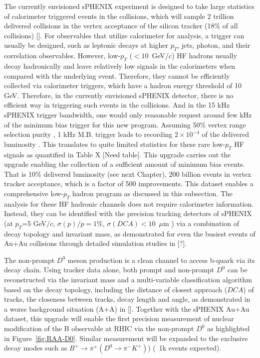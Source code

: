 The currently envisioned sPHENIX experiment is designed to take large statistics of calorimeter triggered events in the \pp collisions, which will sample 2 trillion delivered \pp collisions in the vertex acceptance of the silicon tracker (18\% of all collisions) []. For observables that utilize calorimeter for analysis, a trigger can usually be designed, such as leptonic decays at higher $p_T$, jets, photon, and their correlation observables. However, low-$p_T$  ($<10$~GeV$/c$) HF hadrons usually decay hadronically and leave relatively low signals in the calorimeters when compared with the underlying event. Therefore, they cannot be efficiently collected via calorimeter triggers, which have a hadron energy threshold of 10 GeV. Therefore, in the currently envisioned sPHENIX detector, there is no efficient way in triggering such events in the \pp collisions. And in the 15 kHz sPHENIX trigger bandwidth, one would only reasonable request around few kHz of the minimum bias \pp trigger for this new program. Assuming 50\% vertex range selection purity , 1 kHz M.B. trigger leads to recording $2\times10^{-4}$ of the delivered luminosity . This translates to quite limited statistics for these rare low-$p_T$ HF signals as quantified in Table X [Need table].
This upgrade carries out the upgrade enabling the collection of a sufficient amount of minimum bias \pp events. That is 10\% delivered luminosity (see next Chapter), 200 billion events in vertex tracker acceptance, which is a factor of 500 improvements. This dataset enables a comprehensive low-$p_T$ hadron program as discussed in this subsection. The analysis for these HF hadronic channels does not require calorimeter information. Instead, they can be identified with the precision tracking detectors of sPHENIX (at $p_T$=5 GeV$/c$, $\sigma(p)/p=1\%$, $\sigma(DCA)<10$~$\mu$m ) via a combination of decay topology and invariant mass, as demonstrated for even the busiest events of Au+Au collisions through detailed simulation studies in [?]. 
 
 
The non-prompt $D^0$ meson production is a clean channel to access b-quark via its decay chain. Using tracker data alone, both prompt and non-prompt $D^0$ can be reconstructed via the invariant mass and a multi-variable classification algorithm based on the decay topology, including the distance of closest approach ($DCA$) of tracks, the closeness between tracks, decay length and angle, as demonstrated in a worse background situation (A+A) in []. Together with the sPHENIX Au+Au dataset, this upgrade will enable the first precision measurement of nuclear modification of the B observable at RHIC via the non-prompt $D^0$ as highlighted in Figure~\ref{fig:RAA-D0}. Similar measurement will be expanded to the exclusive decay modes such as $B^+ \rightarrow \pi^+ (D^0 \rightarrow \pi^- K^+)$) (~1k events expected).

